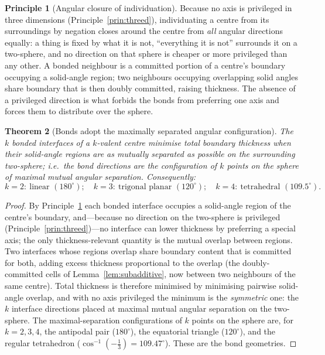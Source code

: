 \documentclass[11pt,twocolumn,a4paper]{article}
\theoremstyle{thmstyle}
\newtheorem{theorem}{Theorem}[section]
\theoremstyle{definition}
\newtheorem{principle}[theorem]{Principle}
\theoremstyle{remark}
\begin{document}
\begin{principle}[Angular closure of individuation]
\label{prin:closure}
Because no axis is privileged in three dimensions
(Principle~\ref{prin:threed}), individuating a centre from its
surroundings by negation closes around the centre from \emph{all} angular
directions equally: a thing is fixed by what it is not, ``everything it is
not'' surrounds it on a two-sphere, and no direction on that sphere is
cheaper or more privileged than any other. A bonded neighbour is a
committed portion of a centre's boundary occupying a solid-angle region;
two neighbours occupying overlapping solid angles share boundary that is
then doubly committed, raising thickness. The absence of a privileged
direction is what forbids the bonds from preferring one axis and forces
them to distribute over the sphere.
\end{principle}

\begin{theorem}[Bonds adopt the maximally separated angular configuration]
\label{thm:geometry}
The $k$ bonded interfaces of a $k$-valent centre minimise total boundary
thickness when their solid-angle regions are as mutually separated as
possible on the surrounding two-sphere; i.e.\ the bond directions are the
configuration of $k$ points on the sphere of maximal mutual angular
separation. Consequently:
\[
k=2:\ \text{linear }(180^\circ);\quad
k=3:\ \text{trigonal planar }(120^\circ);\quad
k=4:\ \text{tetrahedral }(109.5^\circ).
\]
\end{theorem}

\begin{proof}
By Principle~\ref{prin:closure} each bonded interface occupies a
solid-angle region of the centre's boundary, and---because no direction
on the two-sphere is privileged (Principle~\ref{prin:threed})---no
interface can lower thickness by preferring a special axis; the only
thickness-relevant quantity is the mutual overlap between regions. Two
interfaces whose regions
overlap share boundary content that is committed for both, adding excess
thickness proportional to the overlap (the doubly-committed cells of
Lemma~\ref{lem:subadditive}, now between two neighbours of the same
centre). Total thickness is therefore minimised by minimising pairwise
solid-angle overlap, and with no axis privileged the minimum is the
\emph{symmetric} one: the $k$ interface directions placed at
maximal mutual angular separation on the two-sphere. The maximal-separation
configurations of $k$ points on the sphere are, for $k=2,3,4$, the
antipodal pair ($180^\circ$), the equatorial triangle ($120^\circ$), and
the regular tetrahedron ($\cos^{-1}(-\tfrac13)=109.47^\circ$). These are
the bond geometries.
\end{proof}
\end{document}
